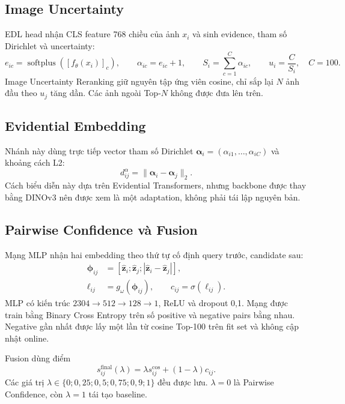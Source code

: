 \documentclass[11pt,a4paper]{article}
\begin{document}
\subsection{Image Uncertainty}
EDL head nhận CLS feature 768 chiều của ảnh $x_i$ và sinh evidence,
tham số Dirichlet và uncertainty:
\begin{equation}
 e_{ic}=\operatorname{softplus}([f_{\theta}(x_i)]_c),\qquad
 \alpha_{ic}=e_{ic}+1,\qquad
 S_i=\sum_{c=1}^{C}\alpha_{ic},\qquad
 u_i=\frac{C}{S_i},\quad C=100.
\end{equation}
Image Uncertainty Reranking giữ nguyên tập ứng viên cosine, chỉ sắp lại $N$ ảnh
đầu theo $u_j$ tăng dần. Các ảnh ngoài Top-$N$ không được đưa lên trên.

\subsection{Evidential Embedding}
Nhánh này dùng trực tiếp vector tham số Dirichlet
$\boldsymbol\alpha_i=(\alpha_{i1},\ldots,\alpha_{iC})$ và khoảng cách L2:
\begin{equation}
 d^{\alpha}_{ij}=\lVert\boldsymbol\alpha_i-\boldsymbol\alpha_j\rVert_2.
\end{equation}
Cách biểu diễn này dựa trên Evidential Transformers, nhưng backbone được thay
bằng DINOv3 nên được xem là một adaptation, không phải tái lập nguyên bản.

\subsection{Pairwise Confidence và Fusion}
Mạng MLP nhận hai embedding theo thứ tự cố định query trước, candidate sau:
\begin{align}
 \boldsymbol\phi_{ij}
 &=[\widehat{\mathbf z}_i;\widehat{\mathbf z}_j;
 |\widehat{\mathbf z}_i-\widehat{\mathbf z}_j|],\\
 \ell_{ij}&=g_{\omega}(\boldsymbol\phi_{ij}),\qquad
 c_{ij}=\sigma(\ell_{ij}).
\end{align}
MLP có kiến trúc $2304\rightarrow512\rightarrow128\rightarrow1$, ReLU và
dropout 0,1. Mạng được train bằng Binary Cross Entropy trên số positive và
negative pairs bằng nhau. Negative gần nhất được lấy một lần từ cosine
Top-100 trên fit set và không cập nhật online.

Fusion dùng điểm
\begin{equation}
 s^{\mathrm{final}}_{ij}(\lambda)
 =\lambda s^{\mathrm{cos}}_{ij}+(1-\lambda)c_{ij}.
\end{equation}
Các giá trị $\lambda\in\{0;0{,}25;0{,}5;0{,}75;0{,}9;1\}$ đều được lưu.
$\lambda=0$ là Pairwise Confidence, còn $\lambda=1$ tái tạo baseline.
\end{document}
